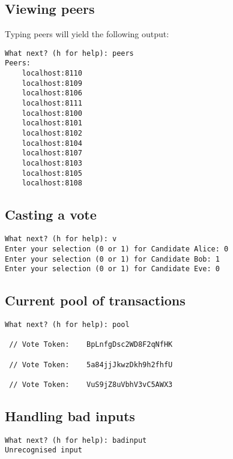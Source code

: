 \documentclass[a4paper,12pt]{article}
\begin{document}
\subsection{Viewing peers}
Typing peers will yield the following output:
\begin{verbatim}
What next? (h for help): peers
Peers:
	localhost:8110
	localhost:8109
	localhost:8106
	localhost:8111
	localhost:8100
	localhost:8101
	localhost:8102
	localhost:8104
	localhost:8107
	localhost:8103
	localhost:8105
	localhost:8108
\end{verbatim}

\subsection{Casting a vote}
\begin{verbatim}
What next? (h for help): v
Enter your selection (0 or 1) for Candidate Alice: 0
Enter your selection (0 or 1) for Candidate Bob: 1
Enter your selection (0 or 1) for Candidate Eve: 0
\end{verbatim}

\subsection{Current pool of transactions}
\begin{verbatim}
What next? (h for help): pool

 // Vote Token:    BpLnfgDsc2WD8F2qNfHK

 // Vote Token:    5a84jjJkwzDkh9h2fhfU

 // Vote Token:    VuS9jZ8uVbhV3vC5AWX3
\end{verbatim}

\subsection{Handling bad inputs}
\begin{verbatim}
What next? (h for help): badinput
Unrecognised input
\end{verbatim}
\end{document}
